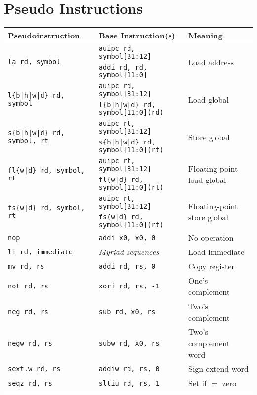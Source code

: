 \section*{Pseudo Instructions}
\small
\begin{tabular}{l l l}
Pseudoinstruction & Base Instruction(s) & Meaning \\ \hline

\multirow{2}{*}{\tt la rd, symbol} & {\tt auipc rd, symbol[31:12]} & \multirow{2}{*}{Load address} \\
                                   & {\tt addi rd, rd, symbol[11:0]} \\
\multirow{2}{*}{\tt l\{b|h|w|d\} rd, symbol} & {\tt auipc rd, symbol[31:12]} & \multirow{2}{*}{Load global} \\
                                           & {\tt l\{b|h|w|d\} rd, symbol[11:0](rd)} \\
\multirow{2}{*}{\tt s\{b|h|w|d\} rd, symbol, rt} & {\tt auipc rt, symbol[31:12]} & \multirow{2}{*}{Store global} \\
                                               & {\tt s\{b|h|w|d\} rd, symbol[11:0](rt)} \\
\multirow{2}{*}{\tt fl\{w|d\} rd, symbol, rt} & {\tt auipc rt, symbol[31:12]} & \multirow{2}{*}{Floating-point load global} \\
                                            & {\tt fl\{w|d\} rd, symbol[11:0](rt)} \\
\multirow{2}{*}{\tt fs\{w|d\} rd, symbol, rt} & {\tt auipc rt, symbol[31:12]} & \multirow{2}{*}{Floating-point store global} \\
                                            & {\tt fs\{w|d\} rd, symbol[11:0](rt)} \\
\hline
{\tt nop} & {\tt addi x0, x0, 0} & No operation \\
{\tt li rd, immediate} & {\em Myriad sequences} & Load immediate \\
{\tt mv rd, rs} & {\tt addi rd, rs, 0} & Copy register \\
{\tt not rd, rs} & {\tt xori rd, rs, -1} & One's complement \\
{\tt neg rd, rs} & {\tt sub rd, x0, rs} & Two's complement \\
{\tt negw rd, rs} & {\tt subw rd, x0, rs} & Two's complement word \\
{\tt sext.w rd, rs} & {\tt addiw rd, rs, 0} & Sign extend word \\
{\tt seqz rd, rs} & {\tt sltiu rd, rs, 1} & Set if $=$ zero \\

\end{tabular}
